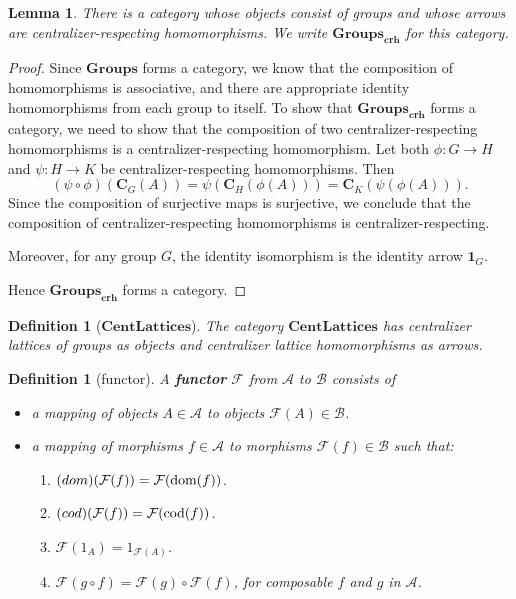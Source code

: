 \documentclass[12pt]{amsart}
\newtheorem{definition}[theorem]{Definition}
\newtheorem{lemma}[theorem]{Lemma}
\begin{document}
\begin{lemma} \label{lem: crh_category}
    There is a category whose objects consist of groups and whose arrows are centralizer-respecting homomorphisms. We write $\mathbf{Groups}_{\mathbf{crh}}$ for this category. 
\end{lemma}
\begin{proof}
    Since $\mathbf{Groups}$ forms a category, we know that the composition of homomorphisms is associative, and there are appropriate identity homomorphisms from each group to itself. To show that $\mathbf{Groups}_{\mathbf{crh}}$ forms a category, we need to show that the composition of two centralizer-respecting homomorphisms is a centralizer-respecting homomorphism. Let both $\phi:G\rightarrow H$ and $\psi:H\rightarrow K$ be centralizer-respecting homomorphisms. Then  
    \[(\psi\circ \phi)(\mathbf{C}_G(A)) = \psi(\mathbf{C}_H(\phi(A))) = \mathbf{C}_K(\psi(\phi(A))).\] Since the composition of surjective maps is surjective, we conclude that the composition of centralizer-respecting homomorphisms is centralizer-respecting. 

    Moreover, for any group $G$, the identity isomorphism is the identity arrow $\mathbf{1}_G$.

    Hence $\mathbf{Groups}_{\mathbf{crh}}$ forms a category.
\end{proof}

\begin{definition}[$\mathbf{CentLattices}$]
The category $\mathbf{CentLattices}$ has centralizer lattices of groups as objects and centralizer lattice homomorphisms as arrows.  
\end{definition}

\begin{definition}[functor]
    A \textbf{functor} $\mathcal{F}$ from $\mathcal{A}$ to $\mathcal{B}$ consists of \begin{itemize}
        \item a mapping of objects $A\in \mathcal{A}$ to objects $\mathcal{F}(A) \in \mathcal{B}$. 
        \item a mapping of morphisms $f \in \mathcal{A}$ to morphisms $\mathcal{F}(f)\in \mathcal{B}$ such that:
        \begin{enumerate}
            \item $\text(dom)(\mathcal{F}(f)) = \mathcal{F}(\text{dom}(f))$.
            \item $\text(cod)(\mathcal{F}(f)) = \mathcal{F}(\text{cod}(f))$.
            \item $\mathcal{F}(1_A)  = 1_{\mathcal{F}(A)}$.
            \item $\mathcal{F}(g\circ f) = \mathcal{F}(g) \circ \mathcal{F}(f)$, for composable $f$ and $g$ in $\mathcal{A}$.
        \end{enumerate}
    \end{itemize}
\end{definition}
\end{document}
